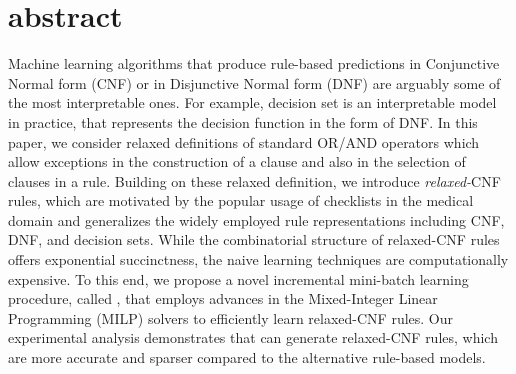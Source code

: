 \section{abstract}
	 Machine learning algorithms that produce  rule-based predictions   in Conjunctive Normal form (CNF) or in Disjunctive Normal form (DNF) are arguably some of the most interpretable ones. For example, decision set is an interpretable model in practice, that represents the decision function in the form of DNF. In this paper, we consider relaxed definitions of standard OR/AND operators which allow exceptions in the construction of a clause and also in the selection of clauses in a rule. Building on these relaxed definition,  we introduce \textit{relaxed-}CNF rules, which are motivated by the popular usage of checklists in the medical domain and generalizes the widely employed rule representations including CNF, DNF, and decision sets.  While the combinatorial structure of relaxed-CNF rules offers exponential succinctness, the naive learning techniques are computationally expensive. 	 To this end, we  propose a novel incremental mini-batch learning procedure, called {\crr}, that employs  advances in the  Mixed-Integer Linear Programming (MILP) solvers to efficiently learn relaxed-CNF rules.  
	 Our  experimental analysis demonstrates that {\crr} can generate relaxed-CNF rules, which are more accurate and sparser compared to the alternative rule-based models. 

